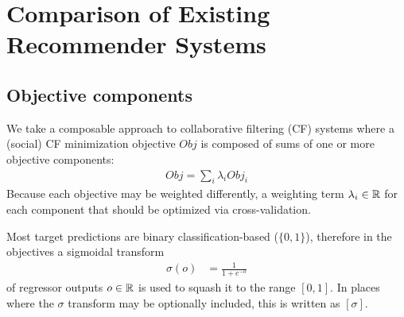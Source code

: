 \chapter{Comparison of Existing Recommender Systems}

\section{Objective components}

We take a composable approach to collaborative filtering (CF) systems
where a (social) CF minimization 
objective $\mathit{Obj}$ is composed of sums of one or more
objective components:
\begin{align}
\mathit{Obj} = \sum_i \lambda_i \mathit{Obj}_i
\end{align}
Because each objective may be weighted differently, a 
weighting term $\lambda_i \in \mathbb{R}$ for each component that should be
optimized via cross-validation.

Most target predictions are binary 
classification-based ($\{0,1\}$), therefore
in the objectives a sigmoidal transform 
\begin{align}
\sigma(o) & = \frac{1}{1 + e^{-o}}
\end{align}
of regressor outputs $o \in \mathbb{R}$ is used to squash it 
to the range $[0, 1]$.  
In places where the $\sigma$ transform may be optionally included, 
this is written as $[\sigma]$.  

